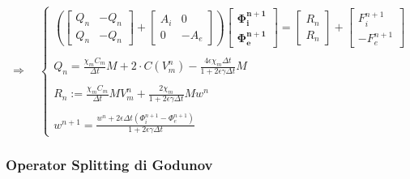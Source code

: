\documentclass[a4paper]{article}
\theoremstyle{definition}
\begin{document}
\begin{equation}
\Rightarrow \quad
\begin{cases}
\left(
\begin{bmatrix} Q_n & -Q_n \\ Q_n & -Q_n \end{bmatrix} + 
\begin{bmatrix} A_i & 0 \\ 0 & -A_e\end{bmatrix}
\right)
\begin{bmatrix}
\bm{\Phi_i^{n+1}} \\ \bm{\Phi_e^{n+1}}
\end{bmatrix}
= \begin{bmatrix} R_n \\ R_n \end{bmatrix} + \begin{bmatrix} F_i^{n+1} \\  -F_e^{n+1}\end{bmatrix} \\ \\
Q_n = \frac{\displaystyle \chi_m C_m}{\displaystyle \Delta t}M + 2 \cdot C(V_m^n) - \frac{\displaystyle 4\epsilon\chi_m \Delta t}{\displaystyle 1 + 2\epsilon \gamma \Delta t}M \\ \\
R_n := \frac{\displaystyle \chi_mC_m}{\displaystyle \Delta t}MV_m^n + \frac{\displaystyle 2\chi_m}{\displaystyle 1+2\epsilon\gamma\Delta t}M w^n \\ \\
w^{n+1} = \frac{\displaystyle w^n + 2\epsilon \Delta t (\Phi_i^{n+1}-\Phi_e^{n+1})}{\displaystyle 1+2\epsilon \gamma \Delta t}
\end{cases}
\end{equation}


\vspace{5mm}
\subsubsection{Operator Splitting di Godunov}
\end{document}
